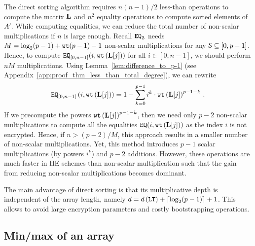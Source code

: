 	The direct sorting algorithm requires $n(n-1)/2$ less-than operations to compute the matrix $\mL$ and $n^2$ equality operations to compute sorted elements of $A'$.
	While computing equalities, we can reduce the total number of non-scalar multiplications if $n$ is large enough.
	Recall $\EQ_\S$ needs $M = \log_2(p-1) + \wt(p-1) - 1$ non-scalar multiplications for any $\S \subseteq [0,p-1]$.
	Hence, to compute $\EQ_{[0,n-1]}(i,\wt\left(\mL[j]\right))$ for all $i \in [0,n-1]$, we should perform $n M$ multiplications.
	Using Lemma~\ref{lem:difference_to_p-1} (see Appendix~\ref{app:proof_thm_less_than_total_degree}), we can rewrite 
	\begin{align*}
		\EQ_{[0,n-1]}\left(i,\wt\left(\mL[j]\right)\right) = 1 - \sum_{k=0}^{p-1} i^k \cdot \wt\left(\mL[j]\right)^{p-1-k}\,.
	\end{align*}
	If we precompute the powers $\wt\left(\mL[j]\right)^{p-1-k}$, then we need only $p-2$ non-scalar multiplications to compute all the equalities $\EQ(i,\wt\left(\mL[j]\right))$ as the index $i$ is not encrypted.
	Hence, if $n > (p-2)/M$, this approach results in a smaller number of non-scalar multiplications.
	Yet, this method introduces $p-1$ scalar multiplications (by powers $i^k$) and $p-2$ additions. 
	However, these operations are much faster in HE schemes than non-scalar multiplication such that the gain from reducing non-scalar multiplications becomes dominant. 
	
	The main advantage of direct sorting is that its multiplicative depth is independent of the array length, namely $d = d\left(\LT\right) + \ceil{\log_2 (p-1)} + 1$.
	This allows to avoid large encryption parameters and costly bootstrapping operations.

\subsection{Min/max of an array}
\label{sec:min/max}

